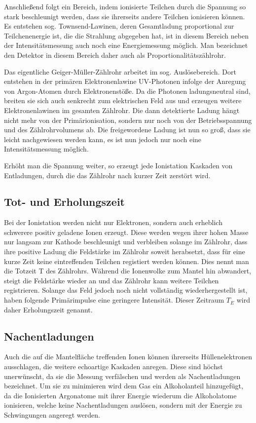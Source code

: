 Anschließend folgt ein Bereich, indem ionisierte Teilchen durch die Spannung so stark  beschleunigt werden, dass sie ihrerseits andere Teilchen ionisieren können. Es entstehen sog. Townsend-Lawinen, deren Gesamtladung proportional zur Teilchenenergie ist, die die Strahlung abgegeben hat, ist in diesem Bereich neben der Intensitätsmessung auch noch eine Energiemessung möglich. Man bezeichnet den Detektor in diesem Bereich daher auch als Proportionalitätszählrohr.

Das eigentliche Geiger-Müller-Zählrohr arbeitet im sog. Auslösebereich. Dort entstehen in der primären Elektronenlawine UV-Photonen infolge der Anregung von Argon-Atomen durch Elektronenstöße. Da die Photonen ladungsneutral sind, breiten sie sich auch senkrecht zum elektrischen Feld aus und erzeugen weitere Elektronenlawinen im gesamten Zählrohr. Die dann detektierte Ladung hängt nicht mehr von der Primärionisation, sondern nur noch von der Betriebsspannung und des Zählrohrvolumens ab. Die freigewordene Ladung ist nun so groß, dass sie leicht nachgewiesen werden kann, es ist nun jedoch nur noch eine Intensitätsmessung möglich.

Erhöht man die Spannung weiter, so erzeugt jede Ionistation Kaskaden von Entladungen, durch die das Zählrohr nach kurzer Zeit zerstört wird.

\subsection{Tot- und Erholungszeit}
Bei der Ionistation werden nicht nur Elektronen, sondern auch erheblich schwerere positiv geladene Ionen erzeugt. Diese werden wegen ihrer hohen Masse nur langsam zur Kathode beschleunigt und verbleiben solange im Zählrohr, dass ihre positive Ladung die Feldstärke im Zählrohr soweit herabsetzt, dass für eine kurze Zeit keine eintreffenden Teilchen registiert werden können. Dies nennt man die Totzeit T des Zählrohrs.
Während die Ionenwolke zum Mantel hin abwandert, steigt die Feldstärke wieder an und das Zählrohr kann weitere Teilchen registrieren. Solange das Feld jedoch noch nicht vollständig wiederhergestellt ist, haben folgende Primärimpulse eine geringere Intensität. Dieser Zeitraum $T_E$ wird daher Erholungszeit genannt.

\subsection{Nachentladungen}
Auch die auf die Mantelfläche treffenden Ionen können ihrerseits Hüllenelektronen ausschlagen, die weitere echoartige Kaskaden anregen. Diese sind höchst unerwünscht, da sie die Messung verfälschen und werden als Nachentladungen bezeichnet. Um sie zu minimieren wird dem Gas ein Alkoholanteil hinzugefügt, da die Ionisierten Argonatome mit ihrer Energie wiederum die Alkoholatome ionisieren, welche keine Nachentladungen auslösen, sondern mit der Energie zu Schwingungen angeregt werden.

